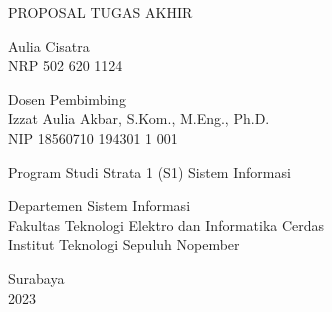 \begin{large}
  PROPOSAL TUGAS AKHIR 
\end{large}

\vspace{\fill}

\begin{spacing}{1.5}
  \begin{Large}
    \tatitle
  \end{Large}
\end{spacing}

\vspace{\fill}

\begin{large}
  Aulia Cisatra \\
  \textmd{NRP 502 620 1124}
\end{large}

\vspace{\fill}

\begin{large}
  \textmd{Dosen Pembimbing} \\
  Izzat Aulia Akbar, S.Kom., M.Eng., Ph.D. \\
  \textmd{NIP 18560710 194301 1 001} \\
\end{large}

\vspace{\fill}

Program Studi Strata 1 (S1) Sistem Informasi \\

\mdseries

Departemen Sistem Informasi \\
Fakultas Teknologi Elektro dan Informatika Cerdas \\
Institut Teknologi Sepuluh Nopember

Surabaya \\
2023
